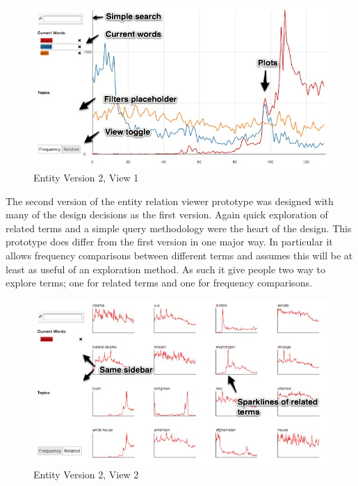 \begin{figure}[htb]
  \centerline{
    \includegraphics[scale=0.37]{figures/relation-1-a.jpg}
  }
  \caption{Entity Version 2, View 1}
  \label{fig:explorer-1-a}
\end{figure}

The second version of the entity relation viewer prototype was designed with many of the design decisions as the first version. Again quick exploration of related terms and a simple query  methodology were the heart of the design. This prototype does differ from the first version in one major way. In particular it allows frequency comparisons between different terms and assumes this will be at least as useful of an exploration method. As such it give people two way to explore terms; one for related terms and one for frequency comparisons.


\begin{figure}[htb]
  \centerline{
    \includegraphics[scale=0.37]{figures/relation-1-b.jpg}
  }
  \caption{Entity Version 2, View 2}
  \label{fig:explorer-1-b}
\end{figure}
